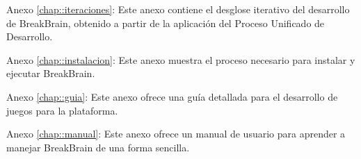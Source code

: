 \begin{definitionlist}
\item [Anexo \ref{chap::iteraciones}: \nameref{chap::iteraciones}] Este anexo contiene el desglose iterativo del desarrollo de BreakBrain, obtenido a partir de la aplicación del Proceso Unificado de Desarrollo.

\item [Anexo \ref{chap::instalacion}: \nameref{chap::instalacion}] Este anexo muestra el proceso necesario para instalar y ejecutar BreakBrain.

\item [Anexo \ref{chap::guia}: \nameref{chap::guia}] Este anexo ofrece una guía detallada para el desarrollo de juegos para la plataforma.

\item [Anexo \ref{chap::manual}: \nameref{chap::manual}] Este anexo ofrece un manual de usuario para aprender a manejar BreakBrain de una forma sencilla.

\end{definitionlist}

